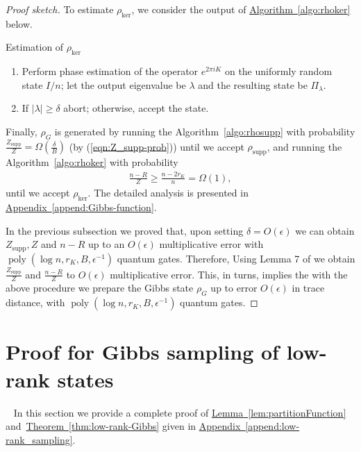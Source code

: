 \documentclass[a4paper,UKenglish,cleveref, autoref]{lipics-v2019}
\theoremstyle{remark}
\numberwithin{equation}{section}
\numberwithin{oracle}{section}
\numberwithin{remark}{section}
\newcommand{\eqn}[1]{(\ref{eqn:#1})}
\newcommand{\thm}[1]{\hyperref[thm:#1]{Theorem~\ref*{thm:#1}}}
\newcommand{\lem}[1]{\hyperref[lem:#1]{Lemma~\ref*{lem:#1}}}
\newcommand{\algo}[1]{\hyperref[algo:#1]{Algorithm~\ref*{algo:#1}}}
\newcommand{\append}[1]{\hyperref[append:#1]{Appendix~\ref*{append:#1}}}
\DeclareMathOperator{\poly}{poly}
\begin{document}
\begin{proof}[Proof sketch]
To estimate $\rho_{\text{ker}}$, we consider the output of \algo{rhoker} below.
\begin{algorithm}
\caption{Estimation of $\rho_{\text{ker}}$}
 \label{algo:rhoker}
\begin{enumerate}
\item Perform phase estimation of the operator $e^{2\pi iK}$ on the uniformly random state $I/n$; let the output eigenvalue be $\lambda$ and the resulting state be $\Pi_\lambda$.
\item If $|\lambda| \ge \delta$ abort; otherwise, accept the state.
\end{enumerate}
\end{algorithm}

Finally, $\rho_G$ is generated by running the Algorithm~\ref{algo:rhosupp} with probability $\frac{Z_{\text{supp}}}{Z}=\Omega(\frac{\delta}{B})$ (by \eqn{Z_supp-prob}) until we accept  $\rho_{\text{supp}}$, and running the Algorithm~\ref{algo:rhoker} with probability
\begin{align}
\frac{n-R}{Z}\geq\frac{n-2r_{K}}{n}=\Omega(1),
\end{align}
until we accept $\rho_{\text{ker}}$. The detailed analysis is presented in \append{Gibbs-function}.

In the previous subsection we proved that, upon setting $\delta=O(\epsilon)$ we can obtain $Z_{\text{supp}}, {Z}$ and $n-R$ up to an $O(\epsilon)$ multiplicative error with $\poly(\log n, r_{K}, B, \epsilon^{-1})$ quantum gates. Therefore, Using Lemma 7 of \cite{vanApeldoorn2017quantum} we obtain  $\frac{Z_{\text{supp}}}{Z}$ and $\frac{n-R}{Z}$ to $O(\epsilon)$ multiplicative error. This, in turns, implies the with the above procedure we prepare the Gibbs state $\rho_G$ up to error $O(\epsilon)$ in trace distance, with $\poly(\log n, r_{K}, B, \epsilon^{-1})$ quantum gates.
\end{proof}



\section{Proof for Gibbs sampling of low-rank states}~\label{append:gibbs}
In this section we provide a complete proof of \lem{partitionFunction} and~\thm{low-rank-Gibbs} given in \append{low-rank_sampling}.
\end{document}
